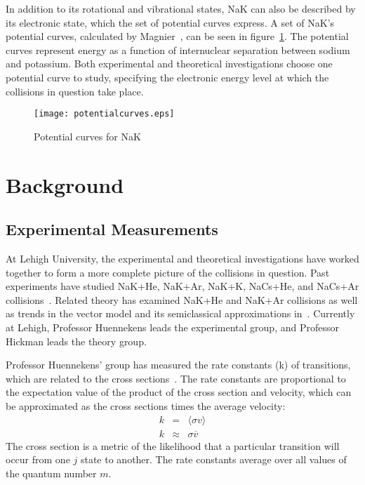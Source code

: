 \documentclass[letterpaper,titlepage,12pt]{article}
\begin{document}
In addition to its rotational and vibrational states, NaK can also be described
by its electronic state, which the set of potential curves express. A set of
NaK's potential curves, calculated by Magnier~\cite{Mag00}, can be seen in
figure~\ref{fig:potentialcurves}. The potential curves represent energy as a
function of internuclear separation between sodium and potassium. Both
experimental and theoretical investigations choose one potential curve to
study, specifying the electronic energy level at which the collisions in
question take place.
\begin{figure}[ht]
    \centering
    \texttt{[image: potentialcurves.eps]}
    \caption{Potential curves for NaK}
\label{fig:potentialcurves}
\end{figure}

\clearpage
\section{Background}
\subsection{Experimental Measurements}
At Lehigh University, the experimental and theoretical investigations have
worked together to form a more complete picture of the collisions in question.
Past experiments have studied NaK+He, NaK+Ar, NaK+K, NaCs+He, and NaCs+Ar
collisions~\cite{Jon15,Wol11}.  Related theory has examined NaK+He and NaK+Ar
collisions as well as trends in the vector model and its semiclassical
approximations in~\cite{Mal15,Ale83,Der84}.  Currently at Lehigh, Professor
Huennekens leads the experimental group, and Professor Hickman leads the theory
group.

Professor Huennekens' group has measured the rate constants (k) of transitions,
which are related to the cross sections~\cite{Hue15_conversation}.  The rate
constants are proportional to the expectation value of the product of the cross
section and velocity, which can be approximated as the cross sections times the
average velocity:
\begin{eqnarray}
    k&=&\langle\sigma v\rangle \nonumber\\
    k&\approx& \sigma \overline{v}
\label{eq:rate_constants}
\end{eqnarray}
The cross section is a metric of the likelihood that a particular transition
will occur from one $j$ state to another.  The rate constants average over all
values of the quantum number $m$.
\end{document}
